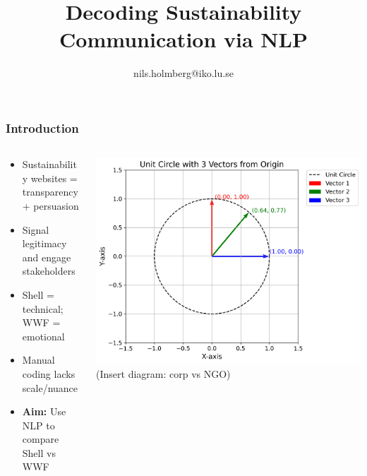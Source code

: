 \documentclass[aspectratio=1610]{beamer}
\title{Decoding Sustainability\\Communication via NLP}
\author{nils.holmberg@iko.lu.se}
\begin{document}
\let\olditem\item
\renewcommand{\item}{\olditem\vspace{8pt}} %
\setlength{\itemsep}{8pt}  %
\setlength{\parskip}{8pt}  %

\begin{frame}[plain]
  \titlepage
\end{frame}

\begin{frame}
  \frametitle{Introduction}
  \begin{columns}[t]
    \begin{column}[t]{0.5\textwidth}
      \begin{itemize}
        \item Sustainability websites = transparency + persuasion
        \item Signal legitimacy and engage stakeholders
        \item Shell = technical; WWF = emotional
        \item Manual coding lacks scale/nuance
        \item \textbf{Aim:} Use NLP to compare Shell vs WWF
      \end{itemize}
    \end{column}
    \begin{column}[t]{0.5\textwidth}
      \vspace*{0pt}
      \includegraphics[width=\linewidth]{../fig/unit_circle_vectors.png}
      (Insert diagram: corp vs NGO)
    \end{column}
  \end{columns}
\end{frame}
\end{document}

